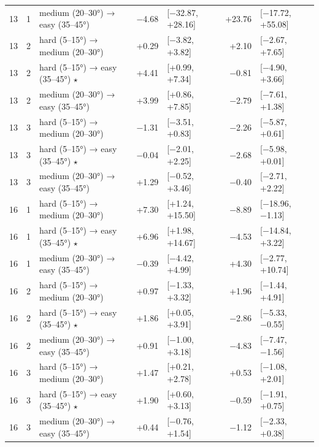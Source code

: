 \begin{table}[htbp]
\begin{tabular}{rllrlrl}
    13 & 1 & medium (20–30°) → easy (35–45°) & −4.68 & [−32.87, +28.16] & +23.76 & [−17.72, +55.08] \\
    13 & 2 & hard (5–15°) → medium (20–30°) & +0.29 & [−3.82, +3.82] & +2.10 & [−2.67, +7.65] \\
    13 & 2 & hard (5–15°) → easy (35–45°) $\star$ & +4.41 & [+0.99, +7.34] & −0.81 & [−4.90, +3.66] \\
    13 & 2 & medium (20–30°) → easy (35–45°) & +3.99 & [+0.86, +7.85] & −2.79 & [−7.61, +1.38] \\
    13 & 3 & hard (5–15°) → medium (20–30°) & −1.31 & [−3.51, +0.83] & −2.26 & [−5.87, +0.61] \\
    13 & 3 & hard (5–15°) → easy (35–45°) $\star$ & −0.04 & [−2.01, +2.25] & −2.68 & [−5.98, +0.01] \\
    13 & 3 & medium (20–30°) → easy (35–45°) & +1.29 & [−0.52, +3.46] & −0.40 & [−2.71, +2.22] \\
    16 & 1 & hard (5–15°) → medium (20–30°) & +7.30 & [+1.24, +15.50] & −8.89 & [−18.96, −1.13] \\
    16 & 1 & hard (5–15°) → easy (35–45°) $\star$ & +6.96 & [+1.98, +14.67] & −4.53 & [−14.84, +3.22] \\
    16 & 1 & medium (20–30°) → easy (35–45°) & −0.39 & [−4.42, +4.99] & +4.30 & [−2.77, +10.74] \\
    16 & 2 & hard (5–15°) → medium (20–30°) & +0.97 & [−1.33, +3.32] & +1.96 & [−1.44, +4.91] \\
    16 & 2 & hard (5–15°) → easy (35–45°) $\star$ & +1.86 & [+0.05, +3.91] & −2.86 & [−5.33, −0.55] \\
    16 & 2 & medium (20–30°) → easy (35–45°) & +0.91 & [−1.00, +3.18] & −4.83 & [−7.47, −1.56] \\
    16 & 3 & hard (5–15°) → medium (20–30°) & +1.47 & [+0.21, +2.78] & +0.53 & [−1.08, +2.01] \\
    16 & 3 & hard (5–15°) → easy (35–45°) $\star$ & +1.90 & [+0.60, +3.13] & −0.59 & [−1.91, +0.75] \\
    16 & 3 & medium (20–30°) → easy (35–45°) & +0.44 & [−0.76, +1.54] & −1.12 & [−2.33, +0.38] \\
    \bottomrule
  \end{tabular}
\end{table}
